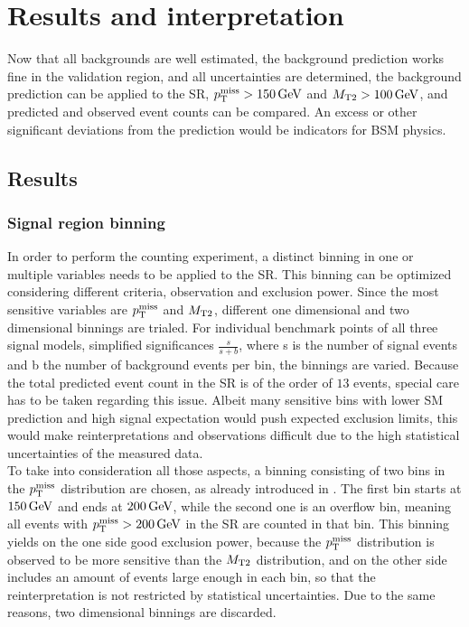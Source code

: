 \chapter{Results and interpretation}\label{chap:results}
\minitoc
Now that all backgrounds are well estimated, the background prediction works fine in the validation region, and all uncertainties are determined, the background prediction can be applied to the SR, $p_{\mathrm{T}}^\text{miss}>150\,\text{Ge\hspace{-.08em}V}$ and $M_{\mathrm{T2}}>100\,\text{Ge\hspace{-.08em}V}$, and predicted and observed event counts can be compared. An excess or other significant deviations from the prediction would be indicators for BSM physics.
\section{Results}\label{sec:results}
\subsection*{Signal region binning}
In order to perform the counting experiment, a distinct binning in one or multiple variables needs to be applied to the SR. This binning can be optimized considering different criteria, \eg observation and exclusion power. Since the most sensitive variables are $p_{\mathrm{T}}^\text{miss}$ and $M_{\mathrm{T2}}$, different one dimensional and two dimensional binnings are trialed. For individual benchmark points of all three signal models, simplified significances $\frac{s}{s+b}$, where s is the number of signal events and b the number of background events per bin, the binnings are varied. Because the total predicted event count in the SR is of the order of $13$ events, special care has to be taken regarding this issue. Albeit many sensitive bins with lower SM prediction and high signal expectation would push expected exclusion limits, this would make reinterpretations and observations difficult due to the high statistical uncertainties of the measured data.\\
To take into consideration all those aspects, a binning consisting of two bins in the $p_{\mathrm{T}}^\text{miss}$ distribution are chosen, as already introduced in . The first bin starts at $150\,\text{Ge\hspace{-.08em}V}$ and ends at $200\,\text{Ge\hspace{-.08em}V}$, while the second one is an overflow bin, meaning all events with $p_{\mathrm{T}}^\text{miss}>200\,\text{Ge\hspace{-.08em}V}$ in the SR are counted in that bin. This binning yields on the one side good exclusion power, because the $p_{\mathrm{T}}^\text{miss}$ distribution is observed to be more sensitive than the $M_{\mathrm{T2}}$ distribution, and on the other side includes an amount of events large enough in each bin, so that the reinterpretation is not restricted by statistical uncertainties. Due to the same reasons, two dimensional binnings are discarded.

